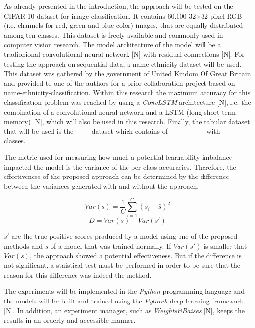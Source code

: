 \documentclass[journal]{IEEEtran}
\begin{document}
As already presented in the introduction, the approach will be tested on the CIFAR-10 dataset for image classification.
It contains 60.000 32$\times$32 pixel RGB (i.e. channels for red, green and blue color) images, that are equally distributed among ten classes.
This dataset is freely available and commonly used in computer vision research.
The model architecture of the model will be a tradionional convolutional neural network [N] with residual connections [N].
For testing the approach on sequential data, a name-ethnicity dataset will be used.
This dataset was gathered by the government of United Kindom Of Great Britain and provided to one of the authors for a prior collaboration project based on name-ethnicity-classification.
Within this research the maximum accuracy for this classification problem was reached by using a \emph{ConvLSTM} architecture [N], i.e. the combination of a convolutional neural network and a LSTM (long-short term memory) [N], which will also be used in this research. 
Finally, the tabular dataset that will be used is the ------ dataset which contains of --------------- with --- classes.

The metric used for measuring how much a potential learnability imbalance impacted the model is the variance of the per-class accuracies.
Therefore, the effectiveness of the proposed approach can be determined by the difference between the variances generated with and without the approach.

\[ Var(s) = \frac{1}{C} \sum_{i=1}^{C} (s_i - \bar{s})^2 \]
\[ D = Var(s) - Var(s') \]

$s'$ are the true positive scores produced by a model using one of the proposed methods and $s$ of a model that was trained normally. 
If $Var(s')$ is smaller that $Var(s)$, the approach showed a potential effectiveness.
But if the difference is not significant, a staistical test must be performed in order to be sure that the reason for this difference was indeed the method.

The experiments will be implemented in the \emph{Python} programming language and the models will be built and trained using the \emph{Pytorch} deep learning framework [N].
In addition, an experiment manager, such as \emph{Weights\&Baises} [N], keeps the results in an orderly and accessible manner.

\end{document}
